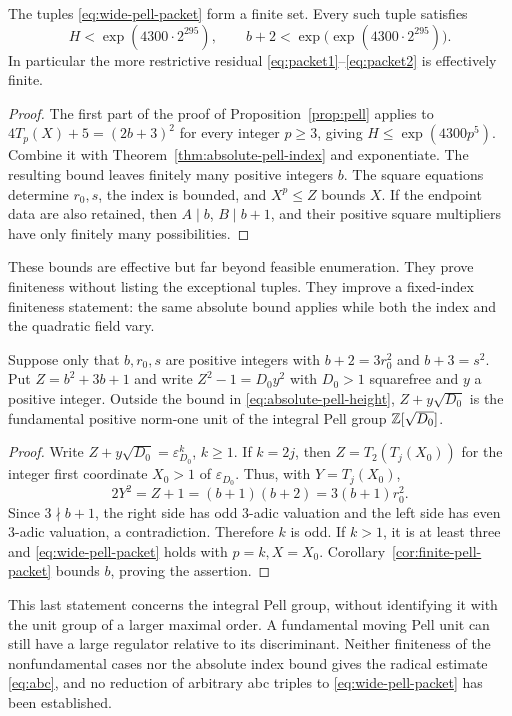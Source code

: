 \begin{corollary}
\label{cor:finite-pell-packet}
The tuples \eqref{eq:wide-pell-packet} form a finite set. Every such tuple
satisfies
\begin{equation}\label{eq:absolute-pell-height}
 H<\exp(4300\cdot2^{295}),\qquad
 b+2<\exp\!\bigl(\exp(4300\cdot2^{295})\bigr).
\end{equation}
In particular the more restrictive residual
\eqref{eq:packet1}--\eqref{eq:packet2} is effectively finite.
\end{corollary}
\begin{proof}
The first part of the proof of Proposition~\ref{prop:pell} applies to
$4T_p(X)+5=(2b+3)^2$ for every integer $p\ge3$, giving
$H\le\exp(4300p^5)$. Combine it with
Theorem~\ref{thm:absolute-pell-index} and exponentiate.
The resulting bound leaves finitely many positive integers $b$.
The square equations determine $r_0,s$, the index is bounded, and
$X^p\le Z$ bounds $X$. If the endpoint data are also retained, then
$A\mid b$, $B\mid b+1$, and their positive square multipliers have only
finitely many possibilities.
\end{proof}

These bounds are effective but far beyond feasible enumeration.
They prove finiteness without listing the exceptional tuples.
They improve a fixed-index finiteness statement: the same absolute bound
applies while both the index and the quadratic field vary.

\begin{corollary}
\label{cor:product-fundamental}
Suppose only that $b,r_0,s$ are positive integers with
$b+2=3r_0^2$ and $b+3=s^2$. Put $Z=b^2+3b+1$ and write
$Z^2-1=D_0y^2$ with $D_0>1$ squarefree and $y$ a positive integer. Outside the bound in
\eqref{eq:absolute-pell-height}, $Z+y\sqrt{D_0}$ is the fundamental
positive norm-one unit of the integral Pell group $\mathbb Z[\sqrt{D_0}]$.
\end{corollary}
\begin{proof}
Write $Z+y\sqrt{D_0}=\varepsilon_{D_0}^k$, $k\ge1$.
If $k=2j$, then $Z=T_2(T_j(X_0))$ for the integer first coordinate
$X_0>1$ of $\varepsilon_{D_0}$. Thus, with $Y=T_j(X_0)$,
\[
 2Y^2=Z+1=(b+1)(b+2)=3(b+1)r_0^2.
\]
Since $3\nmid b+1$, the right side has odd 3-adic valuation and the
left side has even 3-adic valuation, a contradiction. Therefore $k$ is
odd. If $k>1$, it is at least three and
\eqref{eq:wide-pell-packet} holds with $p=k,X=X_0$.
Corollary~\ref{cor:finite-pell-packet} bounds $b$, proving the assertion.
\end{proof}

This last statement concerns the integral Pell group, without identifying
it with the unit group of a larger maximal order. A fundamental moving
Pell unit can still have a large regulator relative to its discriminant.
Neither finiteness of the nonfundamental cases nor the absolute index bound
gives the radical estimate \eqref{eq:abc}, and no reduction of arbitrary
abc triples to \eqref{eq:wide-pell-packet} has been established.
